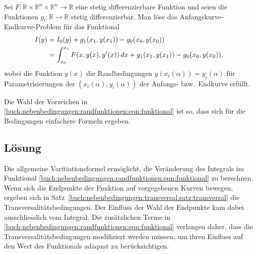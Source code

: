\begin{aufgabe}
\label{buch:nebenbedingungen:randfunktionen:aufgabe}
Sei $F\colon\mathbb{R}\times\mathbb{R}^n \times\mathbb{R}^n\to\mathbb{R}$
eine stetig differenzierbare Funktion und seien die Funktionen 
$g_i\colon\mathbb{R}\to\mathbb{R}$ stetig differenzierbar.
Man löse das Anfangskurve-Endkurve-Problem für das Funktional
\begin{align}
I(y)
&=
I_0(y)
+
g_1(x_1,y(x_1))
-
g_0(x_0,y(x_0))
\notag
\\
&=
\int_{x_0}^{x_1}
F(x,y(x),y'(x))
\,dx
+
g_1(x_1,y(x_1))
-
g_0(x_0,y(x_0)),
\label{buch:nebenbedingungen:randfunktionen:eqn:funktional}
\end{align}
wobei die Funktion $y(x)$ die Randbedingungen
\(
y(x_i(\alpha)) = y_i(\alpha)
\)
für Parametrisierungen der $(x_i(\alpha),y_i(\alpha))$ der Anfangs-
bzw.~Endkurve erfüllt.
\end{aufgabe}

Die Wahl der Vorzeichen in 
\eqref{buch:nebenbedingungen:randfunktionen:eqn:funktional}
ist so, dass sich für die Bedingungen einfachere Formeln ergeben.

%
%
\subsection{Lösung
\label{buch:nebenbedingungen:randfunktionen:subsection:loesung}}
Die allgemeine Varitiationsformel ermöglicht, die Veränderung des
Integrals im Funktional
\eqref{buch:nebenbedingungen:randfunktionen:eqn:funktional}
zu berechnen.
Wenn sich die Endpunkte der Funktion auf vorgegebenen
Kurven bewegen, ergeben sich in
Satz~\ref{buch:nebenbedingungen:transversal:satz:transversal}
die Transversalitätsbedingungen.
Der Einfluss der Wahl der Endpunkte kam dabei ausschliesslich vom
Integral.
Die zusätzlichen Terme in
\eqref{buch:nebenbedingungen:randfunktionen:eqn:funktional}
verlangen daher, dass die Transversalitätsbedingungen modifiziert
werden müssen, um ihren Einfluss auf den Wert des Funktionals
adäquat zu berücksichtigen.

